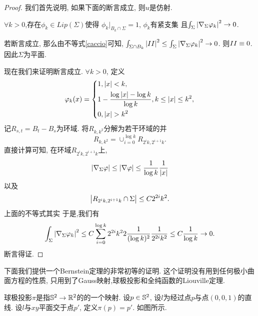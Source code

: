 \begin{proof}
    我们首先说明, 如果下面的断言成立, 则$u$是仿射.
    \begin{claim*}
        $\forall k >0$,存在$\phi_k \in Lip(\Sigma)$使得  $\phi_k|_{B_k \cap \Sigma}=1$, $\phi_k$有紧支集 且$ \int_\Sigma \abs{\nabla_\Sigma \phi_k}^2 \to 0$.
    \end{claim*}
    若断言成立, 那么由不等式\eqref{caccio}可知, $\int_{\Sigma\cap B_k} \abs{II}^2 \le \int_\Sigma \abs{\nabla_\Sigma \phi_k}^2 \to 0$. 则$II\eq 0$. 因此$\Sigma$为平面. 
    \par 现在我们来证明断言成立. $\forall k>0$, 定义
    \begin{equation}
        \phi_k(x)=\left\{
            \begin{aligned}
                &1, \abs{x} < k, \\
                &1-\frac{\log\abs{x}-\log k}{\log k}, k \le \abs{x} \le k^2,\\
                &0, \abs{x} > k^2
            \end{aligned}
        \right.
    \end{equation}
    记$R_{s,t}=B_t-B_s$为环域. 将$R_{k,k^2}$分解为若干环域的并 
    \begin{equation}
        R_{k,k^2}=\cup_{i=0}^{\log k} R_{2^ik,2^{i+1}k}.
    \end{equation}
    直接计算可知, 在环域$R_{2^ik,2^{i+1}k}$上,
    \begin{equation}
        \abs{\nabla_\Sigma \phi} \le \abs{\nabla \phi} \le \frac{1}{\log k} \frac{1}{\abs{x}}
    \end{equation}
    以及
    \begin{equation} \label{logp}
        \abs{R_{2^ik,2^{i+1}k} \cap \Sigma } \le C 2^{2i}k^2. 
    \end{equation}
    上面的不等式其实
    于是,我们有
    \begin{equation}
        \int_\Sigma \abs{\nabla_\Sigma \phi_k}^2 \le C\sum_{i=0}^{\log k} 2^{2i}k^22\frac{1}{(\log k)^2} \frac{1}{2^{2i}k^2} \le C\frac{1}{\log k} \to 0.
    \end{equation}
    断言得证.
\end{proof}
下面我们提供一个Bernstein定理的非常初等的证明. 这个证明没有用到任何极小曲面方程的性质, 只用到了Gauss映射,球极投影和全纯函数的Liouville定理.
\begin{definition}
    球极投影$\pi$是指$\S^2 \to \R^2$的的一个映射. 设$p \in \S^2$, 设$l$为经过点$p$与点$(0,0,1)$的直线. 设$l$与$xy$平面交于点$p'$, 定义$\pi(p)=p'$. 如图所示.
\end{definition}

